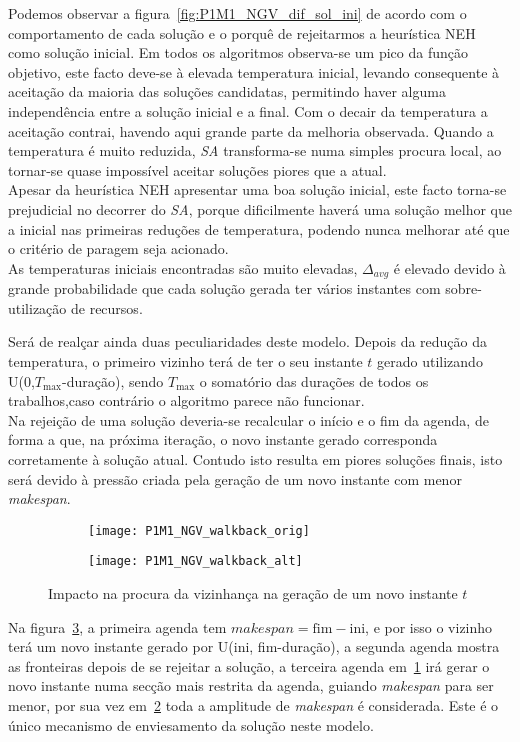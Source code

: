 Podemos observar a figura~\ref{fig:P1M1_NGV_dif_sol_ini} de acordo com o comportamento de cada solução e o porquê de rejeitarmos a heurística NEH como solução inicial. Em todos os algoritmos observa-se um pico da função objetivo, este facto deve-se à elevada temperatura inicial, levando consequente à aceitação da maioria das soluções candidatas, permitindo haver alguma independência entre a solução inicial e a final. Com o decair da temperatura a aceitação contrai, havendo aqui grande parte da melhoria observada. Quando a temperatura é muito reduzida, \textit{SA} transforma-se numa simples procura local, ao tornar-se quase impossível aceitar soluções piores que a atual.\\
Apesar da heurística NEH apresentar uma boa solução inicial, este facto torna-se prejudicial no decorrer do \textit{SA}, porque dificilmente haverá uma solução melhor que a inicial nas primeiras reduções de temperatura, podendo nunca melhorar até que o critério de paragem seja acionado.\\
As temperaturas iniciais encontradas são muito elevadas, $\Delta_{avg}$ é elevado devido à grande probabilidade que cada solução gerada ter vários instantes com sobre-utilização de recursos.

Será de realçar ainda duas peculiaridades deste modelo. Depois da redução da temperatura, o primeiro vizinho terá de ter o seu instante $t$ gerado utilizando U(0,$T_{\max}$-duração), sendo $T_{\max}$ o somatório das durações de todos os trabalhos,caso contrário o algoritmo parece não funcionar.\\
Na rejeição de uma solução deveria-se recalcular o início e o fim da agenda, de forma a que, na próxima iteração, o novo instante gerado corresponda corretamente à solução atual. Contudo isto resulta em piores soluções finais, isto será devido à pressão criada pela geração de um novo instante com menor \textit{makespan}.\\
\begin{figure}[H]
	\centering
	\begin{subfigure}{0.49\textwidth}
	\centering
		\texttt{[image: P1M1\_NGV\_walkback\_orig]}
		\caption{}
		\label{fig:P1M1_NGV_walkback_orig}
	\end{subfigure}
	\begin{subfigure}{0.49\textwidth}
	\centering
		\texttt{[image: P1M1\_NGV\_walkback\_alt]}
		\caption{}
		\label{fig:P1M1_NGV_walkback_alt}
	\end{subfigure}
	\caption{Impacto na procura da vizinhança na geração de um novo instante $t$}
	\label{fig:P1M1_NGV_walkback}
\end{figure}
Na figura~\ref{fig:P1M1_NGV_walkback}, a primeira agenda tem $\textit{makespan}=\text{fim}-\text{ini}$, e por isso o vizinho terá um novo instante gerado por U(ini, fim-duração), a segunda agenda mostra as fronteiras depois de se rejeitar a solução, a terceira agenda em~\ref{fig:P1M1_NGV_walkback_orig} irá gerar o novo instante numa secção mais restrita da agenda, guiando \textit{makespan} para ser menor, por sua vez em~\ref{fig:P1M1_NGV_walkback_alt} toda a amplitude de \textit{makespan} é considerada. Este é o único mecanismo de enviesamento da solução neste modelo.\\

